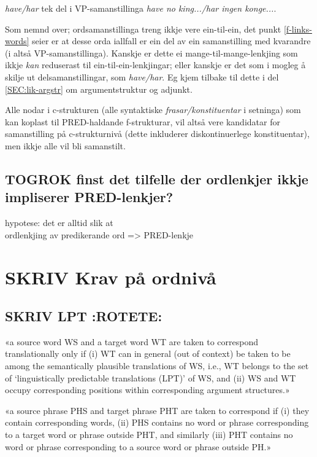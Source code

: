 \documentclass[11pt,a4paper,oneside,draft]{book}
\begin{document}
\emph{have/har} tek del i VP-samanstillinga \emph{have no king.../har ingen konge...}.

Som nemnd over; ordsamanstillinga treng ikkje vere ein-til-ein, det
punkt \ref{f-links-words} seier er at desse orda iallfall er ein del
av ein samanstilling med kvarandre (i \Last altså
VP-samanstillinga). Kanskje er dette ei mange-til-mange-lenkjing som
ikkje \emph{kan} reduserast til ein-til-ein-lenkjingar; eller kanskje er
det som i \Last mogleg å skilje ut delsamanstillingar, som
\emph{have/har}. Eg kjem tilbake til dette i del \ref{SEC:lik-argstr} om
argumentstruktur og adjunkt. 


Alle nodar i c-strukturen (alle syntaktiske \emph{frasar/konstituentar} i
setninga) som kan koplast til PRED-haldande f-strukturar, vil altså
vere kandidatar for samanstilling på c-strukturnivå (dette inkluderer
diskontinuerlege konstituentar), men ikkje alle vil bli samanstilt.
\subsection{\textbf{TOGROK} finst det tilfelle der ordlenkjer ikkje impliserer PRED-lenkjer?}
\label{sec-3.4.1}

   hypotese: det er alltid slik at \\
   ordlenkjing av predikerande ord => PRED-lenkje
\section{\textbf{SKRIV} Krav på ordnivå}
\label{sec-3.5}

\label{SEC:ordkrav}
\subsection{\textbf{SKRIV} LPT \textbf{:ROTETE:}}
\label{sec-3.5.1}

«a source word WS and a target word WT are taken to correspond
translationally only if (i) WT can in general (out of context) be
taken to be among the semantically plausible translations of WS, i.e.,
WT belongs to the set of `linguistically predictable translations
(LPT)' of WS, and (ii) WS and WT occupy corresponding positions within
corresponding argument structures.»

«a source phrase PHS and target phrase PHT are taken to correspond if
(i) they contain corresponding words, (ii) PHS contains no word or
phrase corresponding to a target word or phrase outside PHT, and
similarly (iii) PHT contains no word or phrase corresponding to a
source word or phrase outside PH.»
\end{document}
